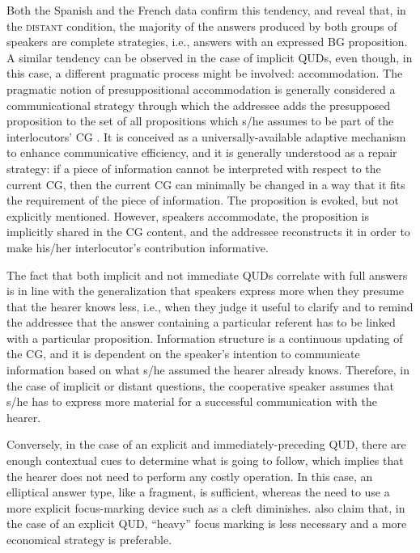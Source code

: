 Both the Spanish and the French data confirm this tendency, and reveal that, in the \textsc{distant} condition, the majority of the answers produced by both groups of speakers are complete strategies, i.e., answers with an expressed BG proposition.
A similar tendency can be observed in the case of implicit QUDs, even though, in this case, a different pragmatic process might be involved: accommodation. The pragmatic  notion  of  presuppositional  accommodation \parencite{lewis1979scorekeeping} is generally considered a communicational strategy through which the addressee adds the presupposed proposition to the set of all propositions which s/he assumes to be part of the interlocutors’ CG \parencite{beaver2007accommodation}. It is conceived as a universally-available adaptive mechanism to enhance communicative efficiency, and it is generally understood as a repair strategy: if a piece of information cannot be interpreted with respect to the current CG, then the current CG can minimally be changed in a way that it fits the requirement of the piece of information. The proposition is evoked, but not explicitly mentioned. However, speakers accommodate, the proposition is implicitly shared in the CG content, and the addressee reconstructs it in order to make his/her interlocutor's contribution informative.

The fact that both implicit and not immediate QUDs correlate with full answers is in line with the generalization that speakers express more when they presume that the hearer knows less, i.e., when they judge it useful  to clarify and to remind the addressee that the answer containing a particular referent has to be linked with a particular proposition.
Information structure is a continuous updating of  the  CG, and it is  dependent on the  speaker’s  intention  to communicate information based on what s/he assumed the hearer already knows. Therefore, in the case of implicit or distant questions, the cooperative speaker assumes that s/he has to express more material for a successful communication with the hearer. 

Conversely, in the case of an explicit and immediately-preceding QUD, there are enough contextual cues to determine what is going to follow, which implies that the hearer does not need to perform any costly operation. In this case, an elliptical answer type, like a fragment, is sufficient, whereas the need to use a more explicit focus-marking device such as a cleft diminishes. \textcite{zimmermann2011focus} also claim that, in the case of an explicit QUD, ``heavy” focus marking is less necessary and a more economical strategy is preferable.

